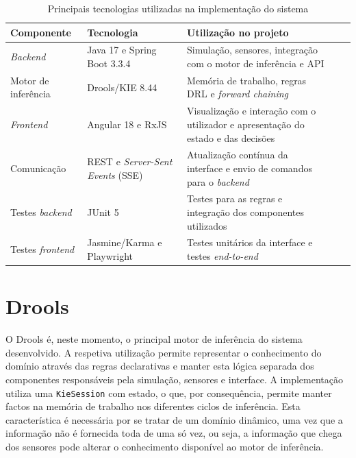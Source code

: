 \begin{table}[H]
  \centering
  \caption{Principais tecnologias utilizadas na implementação do sistema}
  \label{tab:tecnologias}
  \small
  \begin{tabularx}{\textwidth}{@{}L{3.3cm}VL{4.1cm}VX@{}}
    \toprule
    \textbf{Componente} & \textbf{Tecnologia} & \textbf{Utilização no projeto} \\
    \midrule
    \emph{Backend} & Java 17 e Spring Boot 3.3.4 & Simulação, sensores,
      integração com o motor de inferência e API \\ \linhasep
    Motor de inferência & Drools/KIE 8.44 & Memória de trabalho, regras DRL e
      \emph{forward chaining} \\ \linhasep
    \emph{Frontend} & Angular 18 e RxJS & Visualização e interação com o
      utilizador e apresentação do estado e das decisões \\ \linhasep
    Comunicação & REST e \emph{Server-Sent Events} (SSE) & Atualização
      contínua da interface e envio de comandos para o \emph{backend} \\ \linhasep
    Testes \emph{backend} & JUnit 5 & Testes para as regras e integração dos
      componentes utilizados \\ \linhasep
    Testes \emph{frontend} & Jasmine/Karma e Playwright & Testes unitários da
      interface e testes \emph{end-to-end} \\
    \bottomrule
  \end{tabularx}
\end{table}

\FloatBarrier
\section{Drools}
\label{sec:drools}

O Drools é, neste momento, o principal motor de inferência do sistema
desenvolvido. A respetiva utilização permite representar o conhecimento do
domínio através das regras declarativas e manter esta lógica separada dos
componentes responsáveis pela simulação, sensores e interface. A
implementação utiliza uma \texttt{KieSession} com estado, o que, por
consequência, permite manter factos na memória de trabalho nos diferentes
ciclos de inferência. Esta característica é necessária por se tratar de um
domínio dinâmico, uma vez que a informação não é fornecida toda de uma só
vez, ou seja, a informação que chega dos sensores pode alterar o conhecimento
disponível ao motor de inferência.

